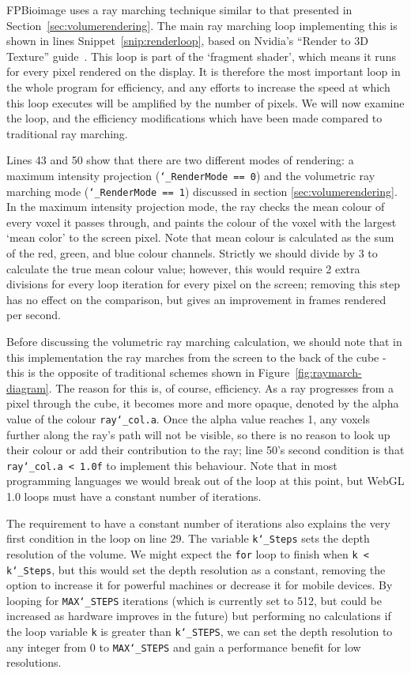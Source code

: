 FPBioimage uses a ray marching technique similar to that presented in Section~\ref{sec:volumerendering}.
The main ray marching loop implementing this is shown in lines Snippet~\ref{snip:renderloop}, based on Nvidia's ``Render to 3D Texture'' guide~\cite{nvidia2008guide}.
This loop is part of the `fragment shader', which means it runs for every pixel rendered on the display.
It is therefore the most important loop in the whole program for efficiency, and any efforts to increase the speed at which this loop executes will be amplified by the number of pixels.
We will now examine the loop, and the efficiency modifications which have been made compared to traditional ray marching.

Lines 43 and 50 show that there are two different modes of rendering: a maximum intensity projection (\texttt{\char`_RenderMode == 0}) and the volumetric ray marching mode (\texttt{\char`_RenderMode == 1}) discussed in section \ref{sec:volumerendering}.
In the maximum intensity projection mode, the ray checks the mean colour of every voxel it passes through, and paints the colour of the voxel with the largest `mean color' to the screen pixel.
Note that mean colour is calculated as the sum of the red, green, and blue colour channels.
Strictly we should divide by $3$ to calculate the true mean colour value; however, this would require 2 extra divisions for every loop iteration for every pixel on the screen; removing this step has no effect on the comparison, but gives an improvement in frames rendered per second. 

Before discussing the volumetric ray marching calculation, we should note that in this implementation the ray marches from the screen to the back of the cube - this is the opposite of traditional schemes shown in Figure~\ref{fig:raymarch-diagram}.
The reason for this is, of course, efficiency.
As a ray progresses from a pixel through the cube, it becomes more and more opaque, denoted by the alpha value of the colour \texttt{ray\char`_col.a}.
Once the alpha value reaches 1, any voxels further along the ray's path will not be visible, so there is no reason to look up their colour or add their contribution to the ray; line 50's second condition is that \texttt{ray\char`_col.a < 1.0f} to implement this behaviour.
Note that in most programming languages we would break out of the loop at this point, but WebGL 1.0 loops must have a constant number of iterations.

The requirement to have a constant number of iterations also explains the very first condition in the loop on line 29.
The variable \texttt{k\char`_Steps} sets the depth resolution of the volume.
We might expect the \texttt{for} loop to finish when \texttt{k < k\char`_Steps}, but this would set the depth resolution as a constant, removing the option to increase it for powerful machines or decrease it for mobile devices.
By looping for \texttt{MAX\char`_STEPS} iterations (which is currently set to 512, but could be increased as hardware improves in the future) but performing no calculations if the loop variable \texttt{k} is greater than \texttt{k\char`_STEPS}, we can set the depth resolution to any integer from 0 to \texttt{MAX\char`_STEPS} and gain a performance benefit for low resolutions.

